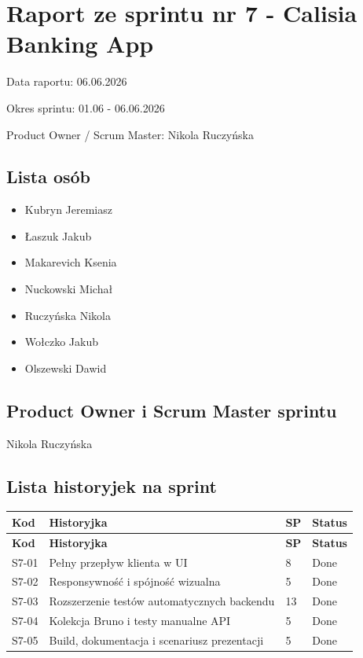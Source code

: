 \documentclass[12pt,a4paper]{article}
\begin{document}
\section*{Raport ze sprintu nr 7 - Calisia Banking App}
Data raportu: 06.06.2026

Okres sprintu: 01.06 - 06.06.2026

Product Owner / Scrum Master: Nikola Ruczyńska

\subsection*{Lista osób}
\begin{itemize}
\item Kubryn Jeremiasz
\item Łaszuk Jakub
\item Makarevich Ksenia
\item Nuckowski Michał
\item Ruczyńska Nikola
\item Wołczko Jakub
\item Olszewski Dawid
\end{itemize}

\subsection*{Product Owner i Scrum Master sprintu}
Nikola Ruczyńska

\subsection*{Lista historyjek na sprint}
\begingroup
\footnotesize
{}
\begin{longtable}{@{}C{0.08\textwidth}L{0.62\textwidth}C{0.10\textwidth}L{0.12\textwidth}@{}}
\toprule
{}
\textbf{Kod} & \textbf{Historyjka} & \textbf{SP} & \textbf{Status} \\
\midrule
\endfirsthead
\toprule
{}
\textbf{Kod} & \textbf{Historyjka} & \textbf{SP} & \textbf{Status} \\
\midrule
\endhead
S7-01 & Pełny przepływ klienta w UI & 8 & Done \\
S7-02 & Responsywność i spójność wizualna & 5 & Done \\
S7-03 & Rozszerzenie testów automatycznych backendu & 13 & Done \\
S7-04 & Kolekcja Bruno i testy manualne API & 5 & Done \\
S7-05 & Build, dokumentacja i scenariusz prezentacji & 5 & Done \\
\bottomrule
\end{longtable}
\endgroup
\end{document}
